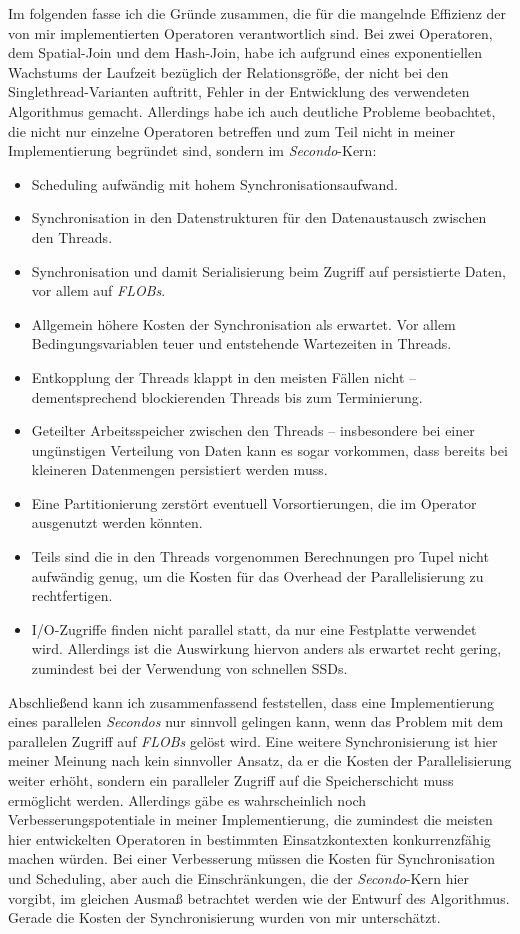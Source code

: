\documentclass[a4paper,12pt,twoside]{article}
\newcommand{\Fb}[1]{\textit{#1}} %
\begin{document}
Im folgenden fasse ich die Gründe zusammen, die für die mangelnde Effizienz der von mir implementierten Operatoren verantwortlich sind. Bei zwei Operatoren, dem Spatial-Join und dem Hash-Join, habe ich aufgrund eines exponentiellen Wachstums der Laufzeit bezüglich der Relationsgröße, der nicht bei den Singlethread-Varianten auftritt, Fehler in der Entwicklung des verwendeten Algorithmus gemacht. Allerdings habe ich auch deutliche Probleme beobachtet, die nicht nur einzelne Operatoren betreffen und zum Teil nicht in meiner Implementierung begründet sind, sondern im \Fb{Secondo}-Kern:

\begin{itemize}
	\item Scheduling aufwändig mit hohem Synchronisationsaufwand.
	\item Synchronisation in den Datenstrukturen für den Datenaustausch zwischen den Threads.
	\item Synchronisation und damit Serialisierung beim Zugriff auf persistierte Daten, vor allem auf \Fb{FLOBs}.
	\item Allgemein höhere Kosten der Synchronisation als erwartet. Vor allem Bedingungsvariablen teuer und entstehende Wartezeiten in Threads.
	\item Entkopplung der Threads klappt in den meisten Fällen nicht -- dementsprechend blockierenden Threads bis zum Terminierung.
	\item Geteilter Arbeitsspeicher zwischen den Threads -- insbesondere bei einer ungünstigen Verteilung von Daten kann es sogar vorkommen, dass bereits bei kleineren Datenmengen persistiert werden muss.
	\item Eine Partitionierung zerstört eventuell Vorsortierungen, die im Operator ausgenutzt werden könnten.
	\item Teils sind die in den Threads vorgenommen Berechnungen pro Tupel nicht aufwändig genug, um die Kosten für das Overhead der Parallelisierung zu rechtfertigen.
	\item I/O-Zugriffe finden nicht parallel statt, da nur eine Festplatte verwendet wird. Allerdings ist die Auswirkung hiervon anders als erwartet recht gering, zumindest bei der Verwendung von schnellen SSDs.
\end{itemize}
 
Abschließend kann ich zusammenfassend feststellen, dass eine Implementierung eines parallelen \Fb{Secondos} nur sinnvoll gelingen kann, wenn das Problem mit dem parallelen Zugriff auf \Fb{FLOBs} gelöst wird. Eine weitere Synchronisierung ist hier meiner Meinung nach kein sinnvoller Ansatz, da er die Kosten der Parallelisierung weiter erhöht, sondern ein paralleler Zugriff auf die Speicherschicht muss ermöglicht werden. Allerdings gäbe es wahrscheinlich noch Verbesserungspotentiale in meiner Implementierung, die zumindest die meisten hier entwickelten Operatoren in bestimmten Einsatzkontexten konkurrenzfähig machen würden. Bei einer Verbesserung müssen die Kosten für Synchronisation und Scheduling, aber auch die Einschränkungen, die der \Fb{Secondo}-Kern hier vorgibt, im gleichen Ausmaß betrachtet werden wie der Entwurf des Algorithmus. Gerade die Kosten der Synchronisierung wurden von mir unterschätzt.

\pagebreak 
\printbibliography[notcategory=nicht-in-bib]
\end{document}

